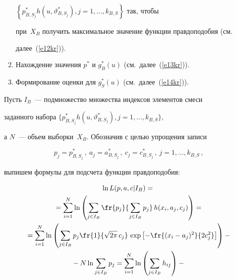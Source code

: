 \begin{multicols}{2}
\begin{enumerate}[1.]
$\left \{ p_{B,S_j}^* h\left( u,\vartheta_{B,S_j}^*\right ), j=1,\ldots ,k_{B,S}\right \}$ так, чтобы 


при~$X_B$ получить максимальное значение функции правдоподобия (см.\ 


далее~(\ref{e12kr})).


\item Нахождение значения $p^*$ и $g_B^*(u)$ (см.\ далее~(\ref{e13kr})).


\item Формирование оценки для $g_S^*(u)$ (см.\ далее~(\ref{e14kr})). 


\end{enumerate}





\bigskip


     Пусть $I_B$~--- подмножество множества индексов элементов смеси 


заданного набора $\{ p_{B,S_j}^* h(u, \vartheta_{B,S_j}^*), j=1,\ldots , k_{B,S}\}$, 


а $N$~--- объем выборки~$X_B$. Обозначив с целью упрощения записи 


$$


p_j =  p_{B,S_j}^*\,,\  


a_j = a_{B,S_j}^*\,,\  


c_j=c_{B,S_j}^*\,, \ j=1,\ldots ,k_{B,S}\,,


$$ 


выпишем формулы для подсчета функции правдоподобия:


     \begin{multline}


   \ln L (p,a,c\vert I_B) ={}\\


   {}= \sum\limits_{i=1}^N \ln\left ( \sum\limits_{j\in I_B }


     \fr{p_j}{\sum\limits_{j\in I_B}p_{j}}\,h(x_i, a_j, c_j )\right )={}\\


     {}=\sum\limits_{i=1}^N\ln \left ( \sum\limits_{j\in I_B} p_j 


\fr{1}{\sqrt{2\pi}\,c_j}\,\exp\left [


     -\fr{(x_i -a_j)^2}{2c_j^2}\right ]\right ) -{}\\


     {}- N\ln \sum\limits_{j\in I_B} p_j =


    \sum\limits_{i=1}^N \ln \left ( \sum\limits_{j\in I_B} h_{ij}\right ) -{}\\



\end{multline}
\end{multicols}
